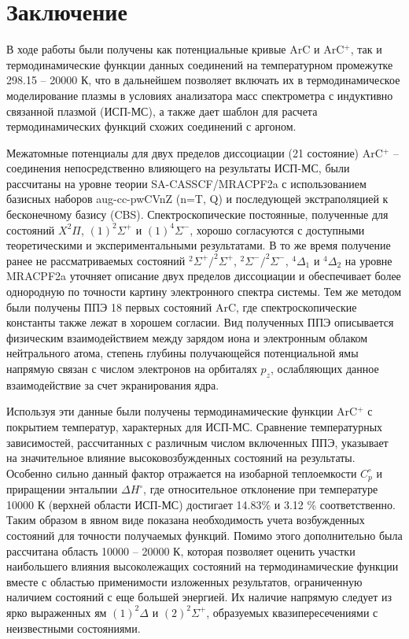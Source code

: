 \documentclass[12pt]{extarticle}
\begin{document}
    \newpage
    \section{Заключение}
    \label{sec:Chapter5}
    
    В ходе работы были получены как потенциальные кривые ArC и ArC$^+$, так и термодинамические функции данных соединений на температурном промежутке 298.15 -- 20000 К, что в дальнейшем позволяет включать их в термодинамическое моделирование плазмы в условиях анализатора масс спектрометра с индуктивно связанной плазмой (ИСП-МС), а также дает шаблон для расчета термодинамических функций схожих соединений с аргоном.
    
    Межатомные потенциалы для двух пределов диссоциации (21 состояние) ArC$^+$ -- соединения непосредственно влияющего на результаты ИСП-МС, были рассчитаны на уровне теории SA-CASSCF/MRACPF2a с использованием базисных наборов aug-cc-pwCVnZ (n=T, Q) и последующей экстраполяцией к бесконечному базису (CBS). Спектроскопические постоянные, полученные для состояний $X^2 \Pi$, $(1)^2 \Sigma^+$ и $(1)^4\Sigma^-$, хорошо согласуются с доступными теоретическими и экспериментальными результатами. В то же время получение ранее не рассматриваемых состояний $^2\Sigma^+/^2\Sigma^+$, $^2\Sigma^-/^2\Sigma^-$, $^4\Delta_1$ и $^4\Delta_2$ на уровне MRACPF2a уточняет описание двух пределов диссоциации и обеспечивает более однородную по точности картину электронного спектра системы. Тем же методом были получены ППЭ 18 первых состояний ArC, где спектроскопические константы также лежат в хорошем согласии. Вид полученных ППЭ описывается физическим взаимодействием между зарядом иона и электронным облаком нейтрального атома, степень глубины получающейся потенциальной ямы напрямую связан с числом электронов на орбиталях $p_z$, ослабляющих данное взаимодействие за счет экранирования ядра.
    
    Используя эти данные были получены термодинамические функции ArC$^+$ с покрытием температур, характерных для ИСП-МС. Сравнение температурных зависимостей, рассчитанных с различным числом включенных ППЭ, указывает на значительное влияние высоковозбужденных состояний на результаты. Особенно сильно данный фактор отражается на изобарной теплоемкости  $C_p^\circ$ и приращении энтальпии $\Delta H^\circ$, где относительное отклонение при температуре 10000 К (верхней области ИСП-МС) достигает 14.83\% и 3.12 \% соответственно. Таким образом в явном виде показана необходимость учета возбужденных состояний для точности получаемых функций. Помимо этого дополнительно была рассчитана область 10000 -- 20000 К, которая позволяет оценить участки наибольшего влияния высоколежащих состояний на термодинамические функции вместе с областью применимости изложенных результатов, ограниченную наличием состояний с еще большей энергией. Их наличие напрямую следует из ярко выраженных ям $(1)^2\Delta$ и $(2)^2\Sigma^+$, образуемых квазипересечениями с неизвестными состояниями.
    
\end{document}
